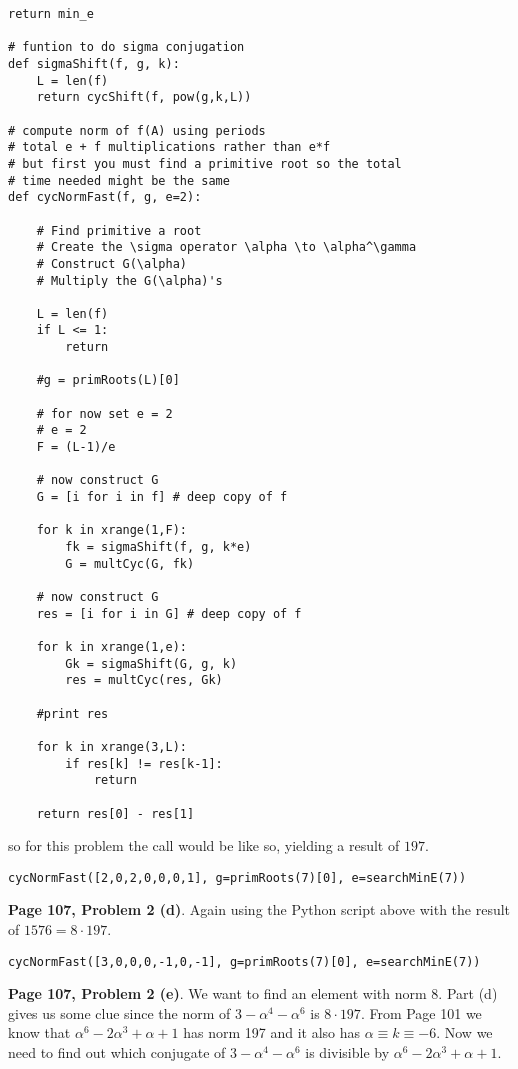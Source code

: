 \documentclass[aps,preprint,preprintnumbers,nofootinbib,showpacs,prd]{revtex4-1}
\begin{document}
\begin{Verbatim}[baselinestretch=0.75]
    return min_e

# funtion to do sigma conjugation
def sigmaShift(f, g, k):
    L = len(f)
    return cycShift(f, pow(g,k,L))

# compute norm of f(A) using periods
# total e + f multiplications rather than e*f
# but first you must find a primitive root so the total
# time needed might be the same
def cycNormFast(f, g, e=2):

    # Find primitive a root
    # Create the \sigma operator \alpha \to \alpha^\gamma
    # Construct G(\alpha)
    # Multiply the G(\alpha)'s

    L = len(f)
    if L <= 1:
        return
    
    #g = primRoots(L)[0]

    # for now set e = 2
    # e = 2
    F = (L-1)/e

    # now construct G
    G = [i for i in f] # deep copy of f

    for k in xrange(1,F):
        fk = sigmaShift(f, g, k*e)
        G = multCyc(G, fk)

    # now construct G
    res = [i for i in G] # deep copy of f

    for k in xrange(1,e):
        Gk = sigmaShift(G, g, k)
        res = multCyc(res, Gk)

    #print res

    for k in xrange(3,L):
        if res[k] != res[k-1]:
            return

    return res[0] - res[1]
\end{Verbatim}
%
so for this problem the call would be like so, yielding a result of $197$.
%
\begin{Verbatim}[baselinestretch=0.75]
cycNormFast([2,0,2,0,0,0,1], g=primRoots(7)[0], e=searchMinE(7))
\end{Verbatim}
%

{\bf Page 107, Problem 2 (d)}. Again using the Python script above with the result of $1576 = 8 \cdot 197$.
%
\begin{Verbatim}[baselinestretch=0.75]
cycNormFast([3,0,0,0,-1,0,-1], g=primRoots(7)[0], e=searchMinE(7))
\end{Verbatim}
%

{\bf Page 107, Problem 2 (e)}. We want to find an element with norm 8. Part (d) gives us some clue since the norm of $3 - \alpha^4 - \alpha^6$ is $8\cdot 197$. From Page 101 we know that $\alpha^6 - 2\alpha^3 + \alpha + 1$ has norm 197 and it also has $\alpha \equiv k \equiv -6$. Now we need to find out which conjugate of $3 - \alpha^4 - \alpha^6$ is divisible by $\alpha^6 - 2\alpha^3 + \alpha + 1$.
\end{document}
